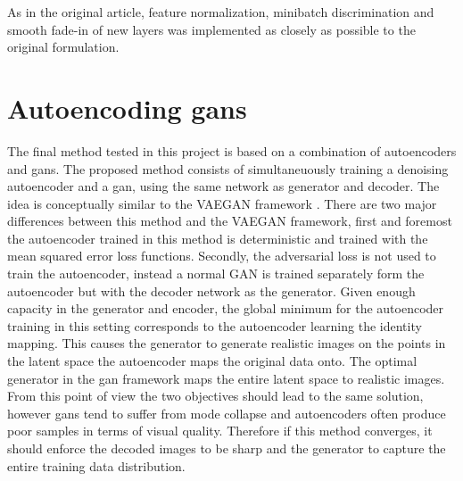As in the original article, feature normalization, minibatch discrimination and smooth fade-in of new layers was implemented as closely as possible to the original formulation.



\section{Autoencoding \acrshort{gans}}
The final method tested in this project is based on a combination of autoencoders and \acrshort{gans}. The proposed method consists of simultaneuously training a denoising autoencoder and a \acrshort{gan}, using the same network as generator and decoder. The idea is conceptually similar to the VAEGAN framework \parencite{LarsenSW15autoencodingbeyond}. There are two major differences between this method and the VAEGAN framework, first and foremost the autoencoder trained in this method is deterministic and trained with the mean squared error loss functions. Secondly, the adversarial loss is not used to train the autoencoder, instead a normal GAN is trained separately form the autoencoder but with the decoder network as the generator. 
Given enough capacity in the generator and encoder, the global minimum for the autoencoder training in this setting corresponds to the autoencoder learning the identity mapping. This causes the generator to generate realistic images on the points in the latent space the autoencoder maps the original data onto. The optimal generator in the \acrshort{gan} framework maps the entire latent space to realistic images. From this point of view the two objectives should lead to the same solution, however \acrshort{gans} tend to suffer from mode collapse and autoencoders often produce poor samples in terms of visual quality. Therefore if this method converges, it should enforce the decoded images to be sharp and the generator to capture the entire training data distribution.

